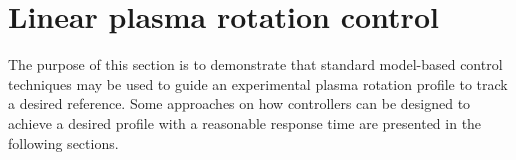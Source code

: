 \documentclass{iopart}
\newcommand{\remark}[1]{\textcolor{blue}{[#1]}}
\begin{document}
%
%
%
\section{Linear plasma rotation control}
 \label{LRPC}
 
 The purpose of this section is to demonstrate that standard model-based control techniques may be used to guide an experimental plasma rotation profile to track a desired reference. Some approaches on how controllers can be designed to achieve a desired profile with a reasonable response time are presented in the following sections.
 
\end{document}
